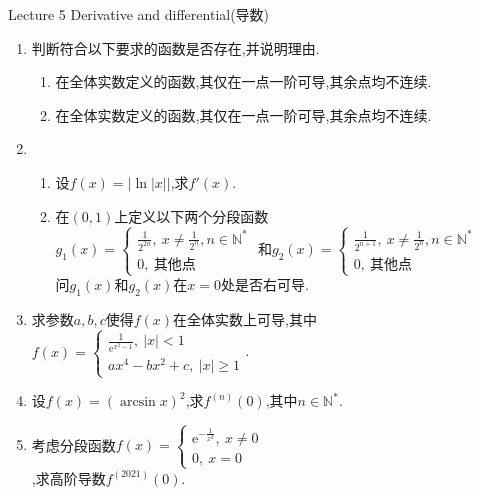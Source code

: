 \documentclass[b5paper,oneside]{ctexart}
\date{\today}
\begin{document}
\pagestyle{empty}
\begin{center}\Large Lecture 5 Derivative and differential(导数)\end{center}
\begin{enumerate}[1.]
    \item 判断符合以下要求的函数是否存在,并说明理由.
        \begin{enumerate}[(1)]
            \item 在全体实数定义的函数,其仅在一点一阶可导,其余点均不连续.
            \item 在全体实数定义的函数,其仅在一点一阶可导,其余点均不连续.
        \end{enumerate}
    \newpage\item 
        \begin{enumerate}[(1)]
        \item 设$f(x)=\left\lvert \ln\left\lvert x\right\rvert \right\rvert $,求$f'(x)$.
        \item 在$(0,1)$上定义以下两个分段函数\\$\displaystyle g_1(x)= \left\{\begin{array}{l} \frac{1}{2^{2n}},\ x\neq \frac{1}{2^n},n \in \mathbb{N}^* \\ 0,\ 其他点 \end{array}\right.$
                                         和$\displaystyle g_2(x)= \left\{\begin{array}{l} \frac{1}{2^{n+1}},\ x\neq \frac{1}{2^n},n \in \mathbb{N}^* \\ 0,\ 其他点 \end{array}\right.$\\
                                         问$g_1(x)$和$g_2(x)$在$x=0$处是否右可导.
        \end{enumerate}
    \newpage\item 求参数$a,b,c$使得$f(x)$在全体实数上可导,其中$\displaystyle f(x)= \left\{\begin{array}{l} \frac{1}{\mathrm{e}^{x^2-1}},\ \left\lvert x\right\rvert<1\\ ax^4-bx^2+c,\ \left\lvert x\right\rvert \geqslant1 \end{array}\right.$.
    \newpage\item 设$f(x)=(\arcsin{x})^2$,求$f^{(n)}(0)$,其中$n\in\mathbb{N}^*$.
    \newpage\item 考虑分段函数$\displaystyle f(x)= \left\{\begin{array}{l} \mathrm{e}^{-\frac{1}{x^2}},\ x\neq 0\\ 0,\ x=0 \end{array}\right.$\\,求高阶导数$f^{(2021)}(0)$.

\end{enumerate}
\end{document}
